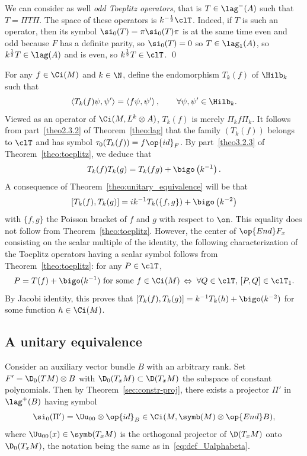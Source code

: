 \begin{rema} \label{rem:odd_toeplitz}
We can consider as well {\em odd Toeplitz operators}, that is $T \in \lag^{-} (A)$ such that $T =
\Pi T \Pi$. The space of these operators is $k^{-\frac{1}{2}} \clT$. Indeed, if $T $ is such an operator, then its symbol $ \si_0 (T) = \pi \si_0 (T) \pi$ is at the same time even and odd because $F$ has a definite parity, so $\si_0(T) =0$ so $T
\in \lag_1 (A)$, so $k^{\frac{1}{2}} T \in \lag (A)$ and is even, so $k^{\frac{1}{2}} T \in \clT$. \qed
\end{rema}


For any $f \in \Ci(M)$ and $k \in \N$, define the endomorphism $T_k(f)$ of $\Hilb_k$ such that
\[
\left\langle T_k (f) \psi, \psi' \right\rangle = \left\langle f \psi, \psi'\right\rangle,
\qquad \forall \psi, \psi' \in \Hilb_k.
\]
Viewed as an operator of $\Ci (M, L^k \otimes A)$, $T_k(f)$ is merely $\Pi_k f \Pi_k$. It follows from part~\eqref{theo2.3.2} of Theorem~\ref{theo:lag} that the family $(T_k(f))$ belongs to $\clT$ and has symbol $\tau_0 (T_k (f))= f
\op{id}_{F}$. By part~\eqref{theo3.2.3} of Theorem~\ref{theo:toeplitz}, we deduce that
\[
T_k (f) T_k (g) = T_k (fg) + \bigo \left(k^{-1}\right).
\]
A consequence of Theorem~\ref{theo:unitary_equivalence} will be that
\[
\left[T_k (f), T_k (g)\right] = i k^{-1} T_k (\{ f,g \}) + \bigo \left(k^{-2}\right)
\]
with $\{ f, g \}$ the Poisson bracket of $f$ and $g$ with respect to $\om$. This equality does not follow from Theorem~\ref{theo:toeplitz}. However,  the center of $\op{End} F_x$ consisting on the scalar multiple of the identity,  the following characterization of the Toeplitz operators having a scalar symbol follows from Theorem~\ref{theo:toeplitz}: for any $P \in
\clT $,
\[
P = T (f) +\bigo (k^{-1}) \text{ for some } f \in \Ci (M) \, \Leftrightarrow \;
\forall Q \in \clT, \, [P,Q] \in \clT_{1}.
\]
By Jacobi identity, this proves that $[T_k (f), T_k (g)] = k^{-1} T_k (h) +
\bigo (k^{-2})$ for some function $h \in \Ci(M)$.

\subsection{A unitary equivalence}\label{sec:unitary-equivalence}

Consider an auxiliary vector bundle $B$ with an arbitrary rank. Set $F' = \D_0 (T M) \otimes B $ with $\D_0 (T_xM) \subset \D (T_xM)$ the subspace of constant polynomials. Then by Theorem~\ref{sec:constr-proj}, there exists a projector $\Pi'$ in $\lag^{+}(B)$ having symbol
\[
\si_0(\Pi') = \Uu_{00} \otimes \op{id}_{B} \in \Ci (M,\symb(M) \otimes \op{End}
B),
\]
where $\Uu_{00} (x) \in \symb (T_xM)$ is the orthogonal projector of
$\D (T_xM)$ onto $\D_0 (T_xM)$, the notation being the same as in~\eqref{eq:def_Ualphabeta}.

